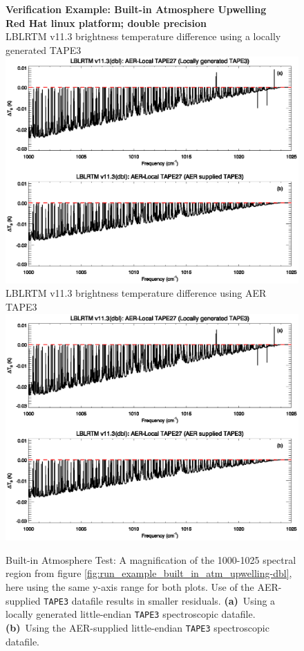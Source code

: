 \begin{figure}[htp]
  \centering
  \qquad\sffamily\textbf{Verification Example: Built-in Atmosphere Upwelling}\\
  \qquad\sffamily\textbf{Red Hat linux platform; double precision}\\
  \qquad\textsf{LBLRTM v11.3 brightness temperature difference using a locally generated TAPE3}\\
  \includegraphics[bb=85 403 534 558,clip,scale=1.0]{graphics/run_example_built_in_atm_upwelling/dbl_1000-1025.eps}
  \qquad\textsf{LBLRTM v11.3 brightness temperature difference using AER TAPE3}\\
  \includegraphics[bb=85 226 534 381,clip,scale=1.0]{graphics/run_example_built_in_atm_upwelling/dbl_1000-1025.eps}
  \caption{Built-in Atmosphere Test: A magnification of the 1000-1025\invcm{} spectral region from figure \ref{fig:run_example_built_in_atm_upwelling-dbl}, here using the same y-axis range for both plots. Use of the AER-supplied \texttt{TAPE3} datafile results in smaller residuals. \mbox{\textbf{(a)} Using} a locally generated little-endian \texttt{TAPE3} spectroscopic datafile. \mbox{\textbf{(b)} Using} the AER-supplied little-endian \texttt{TAPE3} spectroscopic datafile.}
  \label{fig:run_example_built_in_atm_upwelling-dbl_1000-1025}
\end{figure}

